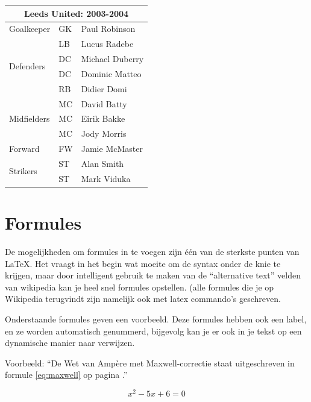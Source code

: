 \begin{flushleft}
\begin{tabular}{|l|l|l|}
\hline
\multicolumn{3}{|c|}{Leeds United: 2003-2004} \\
\hline
 Goalkeeper                  & GK  & Paul Robinson \\ \hline
\multirow{4}{*}{Defenders}   & LB  & Lucus Radebe \\
                             & DC  & Michael Duberry \\
                             & DC  & Dominic Matteo \\
                             & RB  & Didier Domi \\ \hline
\multirow{3}{*}{Midfielders} & MC  & David Batty \\
                             & MC  & Eirik Bakke \\
                             & MC  & Jody Morris \\ \hline
Forward                      & FW  & Jamie McMaster \\ \hline
\multirow{2}{*}{Strikers}    & ST  & Alan Smith \\
                             & ST  & Mark Viduka \\
\hline
\end{tabular}
\end{flushleft}

\section{Formules}

De mogelijkheden om formules in te voegen zijn \'e\'en van de sterkste punten van \LaTeX. 
Het vraagt in het begin wat moeite om de syntax onder de knie te krijgen, maar door intelligent gebruik te maken van de ``alternative text'' velden van wikipedia kan je heel snel formules opstellen.
(alle formules die je op Wikipedia terugvindt zijn namelijk ook met latex commando's geschreven.

Onderstaande formules geven een voorbeeld. Deze formules hebben ook een label, en ze worden automatisch genummerd, bijgevolg kan je er ook in je tekst op een dynamische manier naar verwijzen.

Voorbeeld: ``De Wet van Amp\`ere met Maxwell-correctie staat uitgeschreven in formule \ref{eq:maxwell} op pagina \pageref{eq:maxwell}.''

\begin{equation} \label{eq:polynoom}
x^2 - 5 x + 6 = 0
\end{equation}

